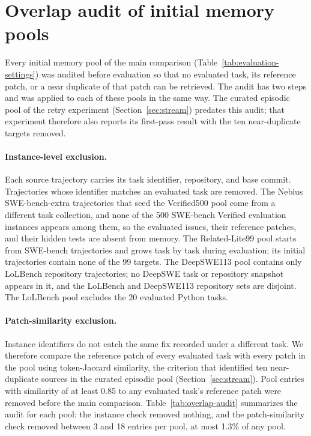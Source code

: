 \section{Overlap audit of initial memory pools}
\label{sec:overlap-audit}
Every initial memory pool of the main comparison
(Table~\ref{tab:evaluation-settings}) was audited before evaluation so that no
evaluated task, its reference patch, or a near duplicate of that patch can be
retrieved. The audit has two steps and was applied to each of these pools in
the same way. The curated episodic pool of the retry experiment
(Section~\ref{sec:stream}) predates this audit; that experiment therefore
also reports its first-pass result with the ten near-duplicate targets
removed.

\paragraph{Instance-level exclusion.}
Each source trajectory carries its task identifier, repository, and base
commit. Trajectories whose identifier matches an evaluated task are removed.
The Nebius SWE-bench-extra trajectories that seed the Verified500 pool come
from a different task collection, and none of the 500 SWE-bench Verified
evaluation instances appears among them, so the evaluated issues, their
reference patches, and their hidden tests are absent from memory. The
Related-Lite99 pool starts from SWE-bench trajectories and grows task by task
during evaluation; its initial trajectories contain none of the 99 targets. The DeepSWE113 pool contains only
LoLBench repository trajectories; no DeepSWE task or repository snapshot appears
in it, and the LoLBench and DeepSWE113 repository sets are disjoint. The
LoLBench pool excludes the 20 evaluated Python tasks.

\paragraph{Patch-similarity exclusion.}
Instance identifiers do not catch the same fix recorded under a different task.
We therefore compare the reference patch of every evaluated task with every
patch in the pool using token-Jaccard similarity, the criterion that identified
ten near-duplicate sources in the curated episodic pool
(Section~\ref{sec:stream}). Pool entries with similarity of at least 0.85 to
any evaluated task's reference patch were removed before the main comparison.
Table~\ref{tab:overlap-audit} summarizes the audit for each pool: the
instance check removed nothing, and the patch-similarity check removed
between 3 and 18 entries per pool, at most 1.3\% of any pool.

